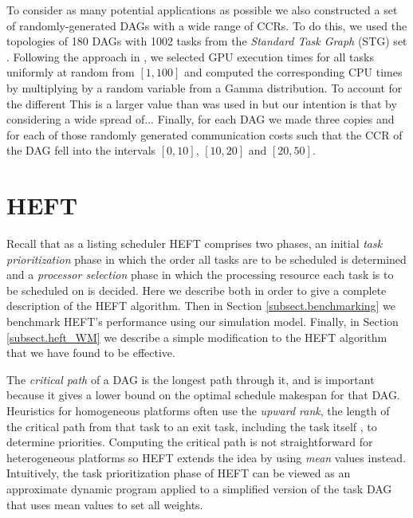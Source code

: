 \documentclass[runningheads]{llncs}
\begin{document}
To consider as many potential applications as possible we also constructed a set of randomly-generated DAGs with a wide range of CCRs. To do this, we used the topologies of 180 DAGs with 1002 tasks from the {\em Standard Task Graph} (STG) set \cite{Tobita2002}. Following the approach in \cite{canon2018}, we selected GPU execution times for all tasks uniformly at random from $[1, 100]$ and computed the corresponding CPU times by multiplying by a random variable from a Gamma distribution. To account for the different This is a larger value than was used in \cite{canon2018} but our intention is that by considering a wide spread of...  Finally, for each DAG we made three copies and for each of those randomly generated communication costs such that the CCR of the DAG fell into the intervals $[0, 10]$, $[10, 20]$ and $[20, 50]$.  

\section{HEFT}
\label{sect.HEFT}

Recall that as a listing scheduler HEFT comprises two phases, an initial {\em task prioritization} phase in which the order all tasks are to be scheduled is determined and a {\em processor selection} phase in which the processing resource each task is to be scheduled on is decided. Here we describe both in order to give a complete description of the HEFT algorithm. Then in Section \ref{subsect.benchmarking} we benchmark HEFT's performance using our simulation model. Finally, in Section \ref{subsect.heft_WM} we describe a simple modification to the HEFT algorithm that we have found to be effective.      

The {\em critical path} of a DAG is the longest path through it, and is important because it gives a lower bound on the optimal schedule makespan for that DAG. Heuristics for homogeneous platforms often use the {\em upward rank}, the length of the critical path from that task to an exit task, including the task itself \cite{topcuoglu2002performance}, to determine priorities. Computing the critical path is not straightforward for heterogeneous platforms so HEFT extends the idea by using {\em mean} values instead. Intuitively, the task prioritization phase of HEFT can be viewed as an approximate dynamic program applied to a simplified version of the task DAG that uses mean values to set all weights.
\end{document}
